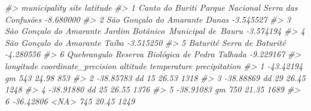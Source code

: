 \documentclass[
]{book}
\newenvironment{Shaded}{\begin{snugshade}}{\end{snugshade}}
\newcommand{\CommentTok}[1]{\textcolor[rgb]{0.37,0.37,0.37}{\textit{#1}}}
\begin{document}
\begin{Shaded}
\begin{Highlighting}[]
\CommentTok{\#\textgreater{}              municipality                                site  latitude}
\CommentTok{\#\textgreater{} 1         Canto do Buriti Parque Nacional Serra das Confusões {-}8.680000}
\CommentTok{\#\textgreater{} 2 São Gonçalo do Amarante                               Dunas {-}3.545527}
\CommentTok{\#\textgreater{} 3 São Gonçalo do Amarante  Jardim Botânico Municipal de Bauru {-}3.574194}
\CommentTok{\#\textgreater{} 4 São Gonçalo do Amarante                               Taíba {-}3.515250}
\CommentTok{\#\textgreater{} 5                Baturité                   Serra de Baturité {-}4.280556}
\CommentTok{\#\textgreater{} 6             Quebrangulo  Reserva Biológica de Pedra Talhada {-}9.229167}
\CommentTok{\#\textgreater{}   longitude coordinate\_precision altitude temperature precipitation}
\CommentTok{\#\textgreater{} 1 {-}43.42194                   gm      543       24.98           853}
\CommentTok{\#\textgreater{} 2 {-}38.85783                   dd       15       26.53          1318}
\CommentTok{\#\textgreater{} 3 {-}38.88869                   dd       29       26.45          1248}
\CommentTok{\#\textgreater{} 4 {-}38.91880                   dd       25       26.55          1376}
\CommentTok{\#\textgreater{} 5 {-}38.91083                   gm      750       21.35          1689}
\CommentTok{\#\textgreater{} 6 {-}36.42806                 \textless{}NA\textgreater{}      745       20.45          1249}


\end{Highlighting}
\end{Shaded}
\end{document}
